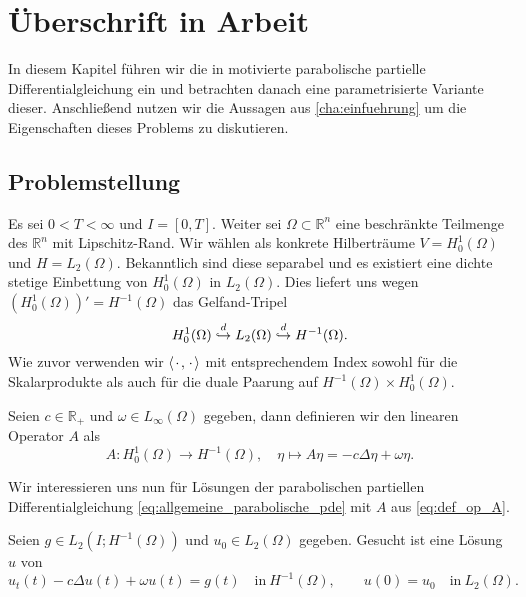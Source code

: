 
\chapter{Überschrift in Arbeit}

In diesem Kapitel führen wir die in \cite{Stasiak:2011ba} motivierte parabolische partielle Differentialgleichung ein und betrachten danach eine parametrisierte Variante dieser.
Anschließend nutzen wir die Aussagen aus \autoref{cha:einfuehrung} um die Eigenschaften dieses Problems zu diskutieren.

\section{Problemstellung} %
\label{sub:problemstellung}

Es sei $0 < T < \infty$ und $I = [0, T]$.
Weiter sei $\Omega \subset \mathbb{R}^{n}$ eine beschränkte Teilmenge des $\mathbb{R}^{n}$ mit Lipschitz-Rand.
Wir wählen als konkrete Hilberträume $V = H^{1}_{0}(\Omega)$ und $H = L_{2}(\Omega)$.
Bekanntlich sind diese separabel und es existiert eine dichte stetige Einbettung von $H^{1}_{0}(\Omega)$ in $L_{2}(\Omega)$.
Dies liefert uns wegen $(H^{1}_{0}(\Omega))' = H^{-1}(\Omega)$ das Gelfand-Tripel
\begin{equation}
    H^{1}_{0}(\Omega) \stackrel{d}{\hookrightarrow} L_{2}(\Omega) \stackrel{d}{\hookrightarrow} H^{-1}(\Omega).
\end{equation}
Wie zuvor verwenden wir $\left\langle{\mkern2mu\cdot\mkern2mu},{\mkern2mu\cdot\mkern2mu}\right\rangle$ mit entsprechendem Index sowohl für die Skalarprodukte als auch für die duale Paarung auf $H^{-1}(\Omega) \times H^{1}_{0}(\Omega)$.

Seien $c \in \mathbb{R}_{+}$ und $\omega \in L_{\infty}(\Omega)$ gegeben, dann definieren wir den linearen Operator $A$ als
\begin{equation}
    \label{eq:def_op_A}
    A \colon H^{1}_{0}(\Omega) \to H^{-1}(\Omega), \quad \eta \mapsto A \eta = - c \Delta \eta + \omega \eta.
\end{equation}

Wir interessieren uns nun für Lösungen der parabolischen partiellen Differentialgleichung \eqref{eq:allgemeine_parabolische_pde} mit $A$ aus \eqref{eq:def_op_A}.
\begin{Problem}
Seien $g \in L_{2}(I; H^{-1}(\Omega))$ und $u_{0} \in L_{2}(\Omega)$ gegeben.
Gesucht ist eine Lösung $u$ von
\begin{equation}
    \label{eq:parabolische_pde}
    u_{t}(t) - c \Delta u(t) + \omega u(t) = g(t) \quad \text{in}~H^{-1}(\Omega),
    \qquad
    u(0) = u_{0} \quad \text{in}~L_{2}(\Omega).
\end{equation}
\end{Problem}

